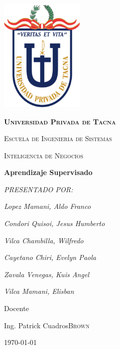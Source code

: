 \documentclass[12pt,a4paper]{report}
\begin{document}
\begin{titlepage}
	\centering
	\includegraphics[width=4cm]{./images/upt}\par\vspace{1cm}
	{\scshape\LARGE\huge\bfseries Universidad Privada de Tacna \par}
	{\scshape\LARGE Escuela de Ingenieria de Sistemas \par}
	\vspace{1cm}
	{\scshape\Large Inteligencia de Negocios\par}
	\vspace{0.5cm}
	{\huge\bfseries Aprendizaje Supervisado \par}
	\vspace{1cm}

	{\Large\itshape PRESENTADO POR:\par}
	{\Large\itshape Lopez Mamani, Aldo Franco \par}
	{\Large\itshape Condori Quisoi, Jesus Humberto\par}
	{\Large\itshape Vilca Chambilla, Wilfredo\par}
	{\Large\itshape Cayetano Chiri, Evelyn Paola\par}
	{\Large\itshape Zavala Venegas, Kuis Angel\par}
	{\Large\itshape Vilca Mamani, Elisban\par}




	\vfill
	Docente\par
	Ing. Patrick Cuadros\textsc{Brown}

	\vfill

	{\large \today\par}

\end{titlepage}
\end{document}

